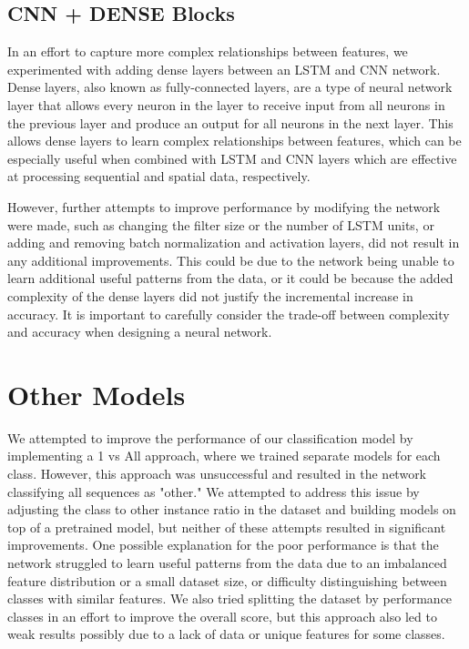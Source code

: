 \documentclass[11pt]{article}
\begin{document}
\subsection{CNN + DENSE Blocks}
In an effort to capture more complex relationships between features, we experimented with adding dense layers between an LSTM and CNN network.
Dense layers, also known as fully-connected layers, are a type of neural network layer that allows every neuron in the layer to receive input from all neurons in the previous layer and produce an output for all neurons in the next layer.
This allows dense layers to learn complex relationships between features, which can be especially useful when combined with LSTM and CNN layers which are effective at processing sequential and spatial data, respectively.

However, further attempts to improve performance by modifying the network were made, such as changing the filter size or the number of LSTM units, or adding and removing batch normalization and activation layers, did not result in any additional improvements.
This could be due to the network being unable to learn additional useful patterns from the data, or it could be because the added complexity of the dense layers did not justify the incremental increase in accuracy.
It is important to carefully consider the trade-off between complexity and accuracy when designing a neural network.


\section{Other Models}
We attempted to improve the performance of our classification model by implementing a 1 vs All approach, where we trained separate models for each class.
However, this approach was unsuccessful and resulted in the network classifying all sequences as "other."
We attempted to address this issue by adjusting the class to other instance ratio in the dataset and building models on top of a pretrained model, but neither of these attempts resulted in significant improvements.
One possible explanation for the poor performance is that the network struggled to learn useful patterns from the data due to an imbalanced feature distribution or a small dataset size, or difficulty distinguishing between classes with similar features.
We also tried splitting the dataset by performance classes in an effort to improve the overall score, but this approach also led to weak results possibly due to a lack of data or unique features for some classes.
\end{document}
